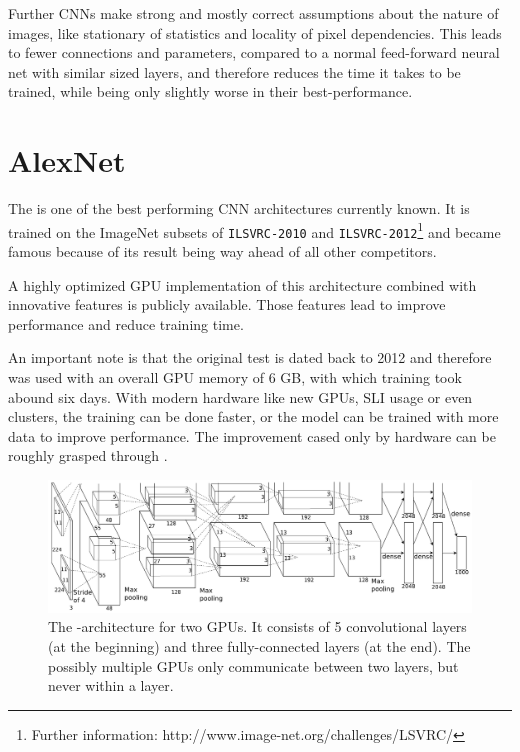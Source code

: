 Further CNNs make strong and mostly correct assumptions about the nature of images, like stationary of statistics and locality of pixel dependencies. This leads to fewer connections and parameters, compared to a normal feed-forward neural net with similar sized layers, and therefore reduces the time it takes to be trained, while being only slightly worse in their best-performance. \cite{krizhevsky2012imagenet}


\section{AlexNet} \label{sec: AlexNet}

The \textit{\alexnet} is one of the best performing CNN architectures currently known. It is trained on the ImageNet subsets of \texttt{ILSVRC-2010} and \texttt{ILSVRC-2012}\footnote{Further information: http://www.image-net.org/challenges/LSVRC/} and became famous because of its result being way ahead of all other competitors.

A highly optimized GPU implementation of this architecture combined with innovative features is publicly available. Those features lead to improve performance and reduce training time.\cite{krizhevsky2012imagenet}

An important note is that the original test is dated back to 2012 and therefore was used with an overall GPU memory of 6 GB, with which training took abound six days. With modern hardware like new GPUs, SLI usage or even clusters, the training can be done faster, or the model can be trained with more data to improve performance. The improvement cased only by hardware can be roughly grasped through \cite{sze2017hardware}.


\begin{figure}[ht]
	\includegraphics[scale = 0.5]{src/pic/AlexNet-structure.PNG}
	\caption{The \alexnet-architecture for two GPUs. It consists of 5 convolutional layers (at the beginning) and three fully-connected layers (at the end). The possibly multiple GPUs only communicate between two layers, but never within a layer.\cite{krizhevsky2012imagenet}}
	\label{pic: AlexNet}
\end{figure}